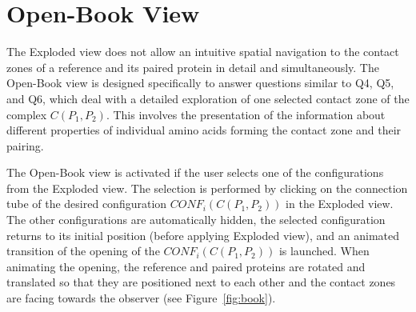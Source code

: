 \documentclass{bmcart}
\def\OpBook {Open-Book view\xspace}
\def\ExpView {Exploded view\xspace}
\begin{document}

\section{Open-Book View}
The \ExpView does not allow an intuitive spatial navigation to the contact zones of a reference and its paired protein in detail and simultaneously.
The \OpBook is designed specifically to answer questions similar to Q4, Q5, and Q6, which deal with a detailed exploration of one selected contact zone of the complex $C(P_1,P_2)$.
This involves the presentation of the information about different properties of individual amino acids forming the contact zone and their pairing.

The \OpBook is activated if the user selects one of the configurations from the \ExpView. 
The selection is performed by clicking on the connection tube of the desired configuration $CONF_i(C(P_1,P_2))$ in the \ExpView.
The other configurations are automatically hidden, the selected configuration returns to its initial position (before applying \ExpView), and an animated transition of the opening of the $CONF_i(C(P_1,P_2))$ is launched.
When animating the opening, the reference and paired proteins are rotated and translated so that they are positioned next to each other and the contact zones are facing towards the observer (see Figure~\ref{fig:book}). 
\end{document}
